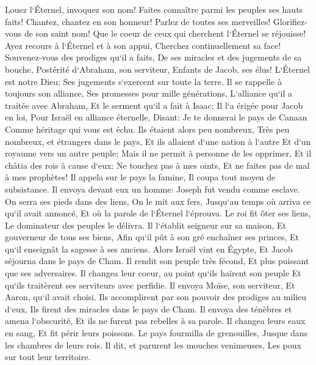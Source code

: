 \verse Louez l`Éternel, invoquez son nom! Faites connaître parmi les peuples ses hauts faits! 
\verse Chantez, chantez en son honneur! Parlez de toutes ses merveilles! 
\verse Glorifiez-vous de son saint nom! Que le coeur de ceux qui cherchent l`Éternel se réjouisse! 
\verse Ayez recours à l`Éternel et à son appui, Cherchez continuellement sa face! 
\verse Souvenez-vous des prodiges qu`il a faits, De ses miracles et des jugements de sa bouche, 
\verse Postérité d`Abraham, son serviteur, Enfants de Jacob, ses élus! 
\verse L`Éternel est notre Dieu; Ses jugements s`exercent sur toute la terre. 
\verse Il se rappelle à toujours son alliance, Ses promesses pour mille générations, 
\verse L`alliance qu`il a traitée avec Abraham, Et le serment qu`il a fait à Isaac; 
\verse Il l`a érigée pour Jacob en loi, Pour Israël en alliance éternelle, 
\verse Disant: Je te donnerai le pays de Canaan Comme héritage qui vous est échu. 
\verse Ils étaient alors peu nombreux, Très peu nombreux, et étrangers dans le pays, 
\verse Et ils allaient d`une nation à l`autre Et d`un royaume vers un autre peuple; 
\verse Mais il ne permit à personne de les opprimer, Et il châtia des rois à cause d`eux: 
\verse Ne touchez pas à mes oints, Et ne faites pas de mal à mes prophètes! 
\verse Il appela sur le pays la famine, Il coupa tout moyen de subsistance. 
\verse Il envoya devant eux un homme: Joseph fut vendu comme esclave. 
\verse On serra ses pieds dans des liens, On le mit aux fers, 
\verse Jusqu`au temps où arriva ce qu`il avait annoncé, Et où la parole de l`Éternel l`éprouva. 
\verse Le roi fit ôter ses liens, Le dominateur des peuples le délivra. 
\verse Il l`établit seigneur sur sa maison, Et gouverneur de tous ses biens, 
\verse Afin qu`il pût à son gré enchaîner ses princes, Et qu`il enseignât la sagesse à ses anciens. 
\verse Alors Israël vint en Égypte, Et Jacob séjourna dans le pays de Cham. 
\verse Il rendit son peuple très fécond, Et plus puissant que ses adversaires. 
\verse Il changea leur coeur, au point qu`ils haïrent son peuple Et qu`ils traitèrent ses serviteurs avec perfidie. 
\verse Il envoya Moïse, son serviteur, Et Aaron, qu`il avait choisi. 
\verse Ils accomplirent par son pouvoir des prodiges au milieu d`eux, Ils firent des miracles dans le pays de Cham. 
\verse Il envoya des ténèbres et amena l`obscurité, Et ils ne furent pas rebelles à sa parole. 
\verse Il changea leurs eaux en sang, Et fit périr leurs poissons. 
\verse Le pays fourmilla de grenouilles, Jusque dans les chambres de leurs rois. 
\verse Il dit, et parurent les mouches venimeuses, Les poux sur tout leur territoire. 
